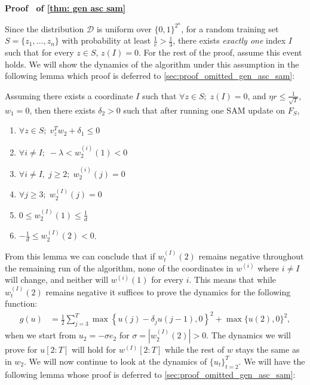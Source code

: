 \documentclass[11pt]{article}
\newcommand{\rad}{r}
\renewenvironment{proof}[1][]{%
  \par\noindent\textbf{\upshape Proof%
  \if\relax\detokenize{#1}\relax\else\ #1\fi}\ %
}{\jmlrQED}
\begin{document}
\begin{proof}[of \cref{thm: gen asc sam}]
Since the distribution $\mathcal{D}$ is uniform over $\{0,1\}^{2^n}$, for a random training set $S = \{z_1, \dots, z_n\}$ with probability at least $\frac{1}{e} > \frac{1}{3}$, there exists \textit{exactly one} index $I$ such that for every $z \in S$, $z(I) = 0$. For the rest of the proof, assume this event holds. We will show the dynamics of the algorithm under this assumption in the following lemma which proof is deferred to \cref{sec:proof_omitted_gen_asc_sam}: 
\begin{lemma}\label{lemma: asc sam proof first update}
    Assuming there exists a coordinate $I$ such that $\forall z\in S; \; z(I) = 0$, and $\eta \rad \leq \frac{1}{\sqrt{T}}$, $w_1 = 0$, then there exists $\delta_2 > 0$ such that after running one SAM update on $F_S$,
    \begin{enumerate}
        \item\label{enum:asc-sam-first-update_1} $\forall z \in S;\; v_z^Tw_2 + \delta_1 \leq 0$ 
        \item \label{enum:asc-sam-first-update_2}$\forall i \neq I; \; -\lambda <  w_2^{(i)}(1) < 0$
        \item\label{enum:asc-sam-first-update_3} $\forall i \neq I, \; j\geq 2; \; w^{(i)}_2(j) = 0$
        \item\label{enum:asc-sam-first-update_4} $\forall j \geq 3; \; w_2^{(I)}(j) = 0$
        \item\label{enum:asc-sam-first-update_5} $0 \leq w_2^{(I)}(1) \leq \frac{1}{d}$
        \item\label{enum:asc-sam-first-update_6} $-\frac{1}{d} \leq w_2^{(I)}(2) < 0 $.
    \end{enumerate}
\end{lemma}
From this lemma we can conclude that if $w_t^{(I)}(2)$ remains negative throughout the remaining run of the algorithm, none of the coordinates in $w^{(i)}$ where $i \neq I$ will change, and neither will $w^{(i)}(1)$ for every $i$. This means that while  $w_t^{(I)}(2)$ remains negative it suffices to prove the dynamics for the following function: 
\begin{align*}
    g(u) & = \frac{1}{2} \sum_{j=3}^T \max\left\{u(j) - \delta_j u(j-1),0\right\}^2 + \max\{u(2), 0\}^2,
\end{align*}
when we start from $u_2 = -\sigma e_2$ for $\sigma = |w_2^{(I)}(2)| > 0$. The dynamics we will prove for $u[2:T]$ will hold for $w^{(I)}[2:T]$ while the rest of $w$ stays the same as in $w_2$. We will now continue to look at the dynamics of $\{u_t\}_{t=2}^T$. We will have the following lemma whose proof is deferred to \cref{sec:proof_omitted_gen_asc_sam}: 

\end{proof}
\end{document}
